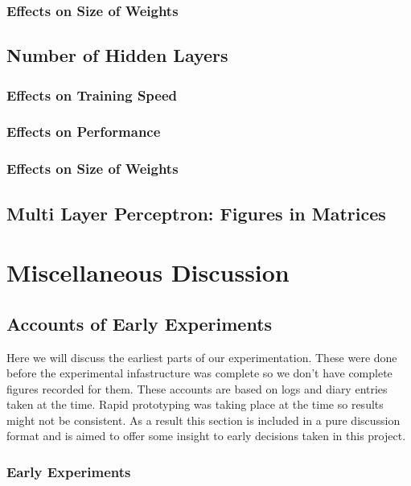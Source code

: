 \subsubsection{Effects on Size of Weights}

\subsection{Number of Hidden Layers}
\subsubsection{Effects on Training Speed}
\subsubsection{Effects on Performance}
\subsubsection{Effects on Size of Weights}

\subsection{Multi Layer Perceptron: Figures in Matrices}

\section{Miscellaneous Discussion}
\subsection{Accounts of Early Experiments}
Here we will discuss the earliest parts of our experimentation. These were done before the experimental infastructure was complete so we don't have complete figures recorded for them. These accounts are based on logs and diary entries taken at the time. Rapid prototyping was taking place at the time so results might not be consistent. As a result this section is included in a pure discussion format and is aimed to offer some insight to early decisions taken in this project.

\subsubsection{Early Experiments}
